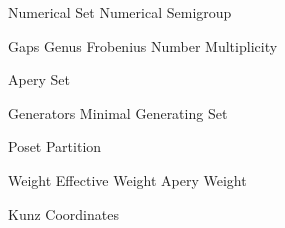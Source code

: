 Numerical Set
Numerical Semigroup

Gaps
Genus
Frobenius Number
Multiplicity

Apery Set

Generators
Minimal Generating Set

Poset
Partition

Weight
Effective Weight
Apery Weight

Kunz Coordinates
